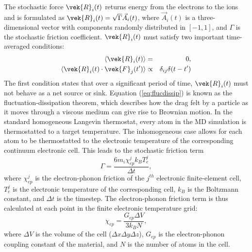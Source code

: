 The stochastic force $\vek{R}_{i}(t)$ returns energy from the 
electrons to the ions and is formulated as 
$\vek{R}_{i}(t) = \sqrt{\Gamma} \vec{A}_{i}(t)$, where $\vec{A}_{i}(t)$ 
is a three-dimensional vector with components randomly distributed 
in $[-1,1]$, and $\Gamma$ is the stochastic friction coefficient. 
$\vek{R}_{i}(t)$ must satisfy two important time-averaged conditions:
\begin{eqnarray}
\langle \vek{R}_{i}(t) \rangle &=& 0, \\
\langle \vek{R}_{i}(t) \cdot \vek{F}_{j}(t^{\prime}) \rangle &\propto& \delta_{ij} \delta (t-t^{\prime}) \label{eq:flucdissip}
\end{eqnarray}
The first condition states that over a significant period of time, 
$\vek{R}_{i}(t)$ must not behave as a net source or sink. Equation 
(\ref{eq:flucdissip}) is known as the fluctuation-dissipation theorem, 
which describes how the drag felt by a particle as it moves through 
a viscous medium can give rise to Brownian motion. In the standard 
homogeneous Langevin thermostat, every atom in the MD simulation 
is thermostatted to a target temperature. The inhomogeneous case 
allows for each atom to be thermostatted to the electronic temperature 
of the corresponding continuum electronic cell. This leads to the 
stochastic friction term
\begin{equation}
\Gamma = \frac{6 m_{i} \chi_{ep}^j k_B T_e^j}{\Delta t},
\end{equation}
where $\chi_{ep}^j$ is the electron-phonon friction of the $j^{th}$ 
electronic finite-element cell, $T_e^j$ is the electronic temperature 
of the corresponding cell, $k_B$ is the Boltzmann constant, and 
$\Delta t$ is the timestep. The electron-phonon friction term is thus 
calculated at each point in the finite electronic temperature grid:
\begin{equation} \label{eq:chiep}
\chi_{ep} = \frac{G_{ep} \Delta V}{3 k_B N},
\end{equation}
where $\Delta V$ is the volume of the cell ($\Delta x \Delta y \Delta z$), 
$G_{ep}$ is the electron-phonon coupling constant of the material, and 
$N$ is the number of atoms in the cell. 

